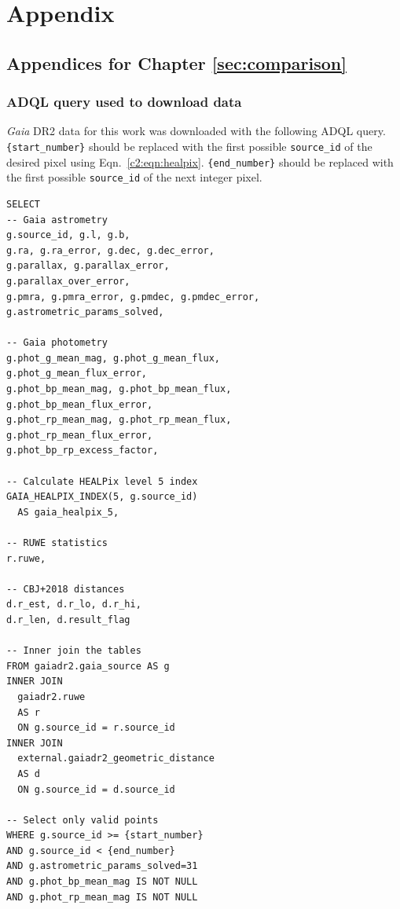 %
\chapter{Appendix}
\label{sec:appendix}



\section{Appendices for Chapter \ref{sec:comparison}}

\subsection{ADQL query used to download data}\label{app:c2:adql}

 \emph{Gaia}  DR2 data for this work was downloaded with the following ADQL query. \texttt{\{start\_number\}} should be replaced with the first possible \texttt{source\_id} of the desired pixel using Eqn.~\ref{c2:eqn:healpix}. \texttt{\{end\_number\}} should be replaced with the first possible \texttt{source\_id} of the next integer pixel.

\begin{verbatim}
SELECT
-- Gaia astrometry
g.source_id, g.l, g.b, 
g.ra, g.ra_error, g.dec, g.dec_error, 
g.parallax, g.parallax_error, 
g.parallax_over_error, 
g.pmra, g.pmra_error, g.pmdec, g.pmdec_error, 
g.astrometric_params_solved, 

-- Gaia photometry
g.phot_g_mean_mag, g.phot_g_mean_flux, 
g.phot_g_mean_flux_error, 
g.phot_bp_mean_mag, g.phot_bp_mean_flux, 
g.phot_bp_mean_flux_error, 
g.phot_rp_mean_mag, g.phot_rp_mean_flux, 
g.phot_rp_mean_flux_error, 
g.phot_bp_rp_excess_factor, 

-- Calculate HEALPix level 5 index
GAIA_HEALPIX_INDEX(5, g.source_id) 
  AS gaia_healpix_5, 
               
-- RUWE statistics
r.ruwe, 
               
-- CBJ+2018 distances
d.r_est, d.r_lo, d.r_hi, 
d.r_len, d.result_flag 
               
-- Inner join the tables
FROM gaiadr2.gaia_source AS g 
INNER JOIN 
  gaiadr2.ruwe 
  AS r 
  ON g.source_id = r.source_id 
INNER JOIN 
  external.gaiadr2_geometric_distance 
  AS d 
  ON g.source_id = d.source_id 
           
-- Select only valid points
WHERE g.source_id >= {start_number} 
AND g.source_id < {end_number} 
AND g.astrometric_params_solved=31 
AND g.phot_bp_mean_mag IS NOT NULL 
AND g.phot_rp_mean_mag IS NOT NULL
\end{verbatim}


